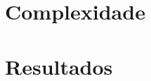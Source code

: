 \documentclass[18pt]{beamer}
\begin{document}
\section{Complexidade}
		
\section{Resultados}
			

		
		
			
					
				
				
				
				
			
			
				
				
				
			
			
			
				
			
			
			
			
			
			
		
		
		
		
		
	
\end{document}
